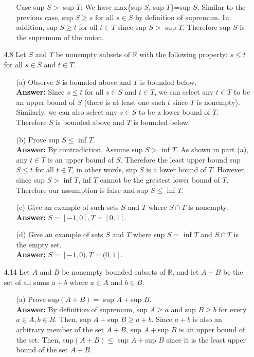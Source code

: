\documentclass{article}
\begin{document}
\begin{itemize}
\begin{itemize}
                    Case sup $S>$ sup $T$: We have max\{sup $S$, sup $T$\}=sup $S$. Similar to the previous case, sup $S\geq s$ for all $s\in S$ by definition of supremum. In addition, sup $S\geq t$ for all $t\in T$ since sup $S>$ sup $T$. Therefore sup $S$ is the supremum of the union.
          \end{itemize}
    \item [4.8] Let $S$ and $T$ be nonempty subsets of $\mathbb{R}$ with the following property: $s\leq t$ for all $s\in S$ and $t\in T$.
          \begin{itemize}
              \item [(a)] Observe $S$ is bounded above and $T$ is bounded below.\\
                    \textbf{Answer: } Since $s\leq t$ for all $s\in S$ and $t\in T$, we can select any $t\in T$ to be an upper bound of $S$ (there is at least one such $t$ since $T$ is nonempty). Similarly, we can also select any $s\in S$ to be a lower bound of $T$. Therefore $S$ is bounded above and $T$ is bounded below.
              \item [(b)] Prove sup $S\leq$ inf $T$.\\
                    \textbf{Answer: } By contradiction. Assume sup $S>$ inf $T$. As shown in part (a), any $t\in T$ is an upper bound of $S$. Therefore the least upper bound sup $S\leq t$ for all $t\in T$, in other words, sup $S$ is a lower bound of $T$. However, since sup $S>$ inf $T$, inf $T$ cannot be the greatest lower bound of $T$. Therefore our assumption is false and sup $S\leq$ inf $T$.
              \item [(c)] Give an example of such sets $S$ and $T$ where $S\cap T$ is nonempty.\\
                    \textbf{Answer: } $S=[-1,0], T=[0,1]$.
              \item [(d)] Give an example of sets $S$ and $T$ where sup $S=$ inf $T$ and $S\cap T$ is the empty set.\\
                    \textbf{Answer: } $S=[-1,0), T=(0,1]$.
          \end{itemize}
    \item [4.14] Let $A$ and $B$ be nonempty bounded subsets of $\mathbb{R}$, and let $A+B$ be the set of all sums $a+b$ where $a\in A$ and $b\in B$.
          \begin{itemize}
              \item [(a)] Prove sup$(A+B)=$ sup $A+$sup $B$.\\
                    \textbf{Answer: } By definition of supremum, sup $A\geq a$ and sup $B\geq b$ for every $a\in A, b\in B$. Then, sup $A+$sup $B\geq a+b$. Since $a+b$ is also an arbitrary member of the set $A+B$, sup $A+$sup $B$ is an upper bound of the set. Then, sup$(A+B)\leq$ sup $A+$sup $B$ since it is the least upper bound of the set $A+B$. \\

\end{itemize}
\end{itemize}
\end{document}
